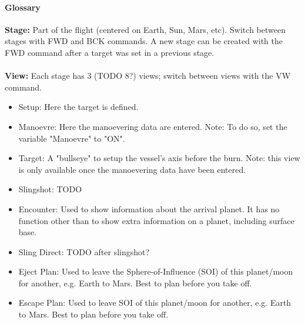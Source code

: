 \documentclass[Orbiter User Manual.tex]{subfiles}
\begin{document}
\paragraph{Glossary}
\textbf{Stage:} Part of the flight (centered on Earth, Sun, Mars, etc). Switch between stages with FWD and BCK commands. A new stage can be created with the FWD command after a target was set in a previous stage.\\
\\
\textbf{View:} Each stage has 3 (TODO 8?) views; switch between views with the VW command.
\begin{itemize}
\item Setup: Here the target is defined.
\item Manoevre: Here the manoevering data are entered. Note: To do so, set the variable "Manoevre" to "ON".
\item Target: A "bullseye" to setup the vessel's axis before the burn. Note: this view is only available once the manoevering data have been entered.

\item Slingshot: TODO
\item Encounter: Used to show information about the arrival planet. It has no function other than to show extra information on a planet, including surface base.
\item Sling Direct: TODO after slingshot?
\item Eject Plan: Used to leave the Sphere-of-Influence (SOI) of this planet/moon for another, e.g. Earth to Mars. Best to plan before you take off.
\item Escape Plan: Used to leave SOI of this planet/moon for another, e.g. Earth to Mars. Best to plan before you take off.
\end{itemize}

\noindent
\end{document}
